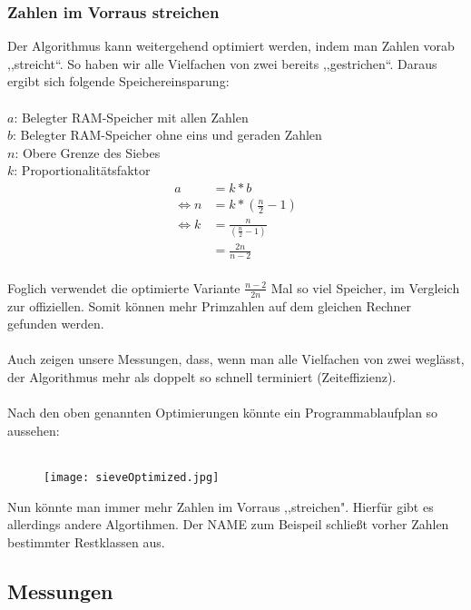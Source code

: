 \documentclass[a4paper,12pt]{article}
\begin{document}
\subsubsection{Zahlen im Vorraus streichen}
Der Algorithmus kann weitergehend optimiert werden, indem man Zahlen vorab ,,streicht“. So haben wir alle Vielfachen von zwei bereits ,,gestrichen“. Daraus ergibt sich folgende Speichereinsparung:\\
\\
$a$: Belegter RAM-Speicher mit allen Zahlen\\
$b$: Belegter RAM-Speicher ohne eins und geraden Zahlen\\
$n$: Obere Grenze des Siebes\\
$k$: Proportionalitätsfaktor\\

\begin{align}
a &= k * b\\
\Leftrightarrow n &= k * ( \frac{n}{2} - 1 )\\
\Leftrightarrow k &= \frac{n}{( \frac{n}{2} - 1 )}\\
&= \frac{2n}{n-2}
\end{align}
\\
Foglich verwendet die optimierte Variante $\frac{n-2}{2n}$ Mal so viel Speicher, im Vergleich zur offiziellen. Somit können mehr Primzahlen auf dem gleichen Rechner gefunden werden.\\
\\
Auch zeigen unsere Messungen, dass, wenn man alle Vielfachen von zwei weglässt, der Algorithmus mehr als doppelt so schnell terminiert (Zeiteffizienz).\\
\\
Nach den oben genannten Optimierungen könnte ein Programmablaufplan so aussehen:\\\\
\begin{figure}[H]
\texttt{[image: sieveOptimized.jpg]}
\end{figure}

Nun könnte man immer mehr Zahlen im Vorraus ,,streichen". Hierfür gibt es allerdings andere Algortihmen. Der NAME zum Beispeil schließt vorher Zahlen bestimmter Restklassen aus.

\subsection{Messungen}
\end{document}
